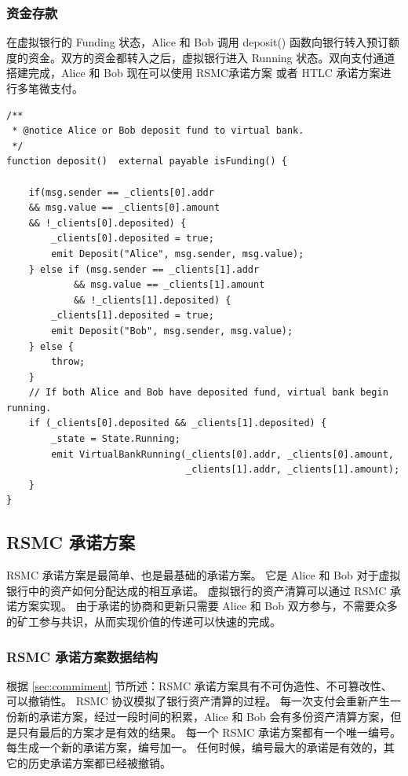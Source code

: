 \begin{appendices}
\subsubsection{资金存款}
在虚拟银行的 Funding 状态，Alice 和 Bob 调用 deposit() 函数向银行转入预订额度的资金。双方的资金都转入之后，虚拟银行进入 Running 状态。双向支付通道搭建完成，Alice 和 Bob 现在可以使用 RSMC承诺方案 或者 HTLC 承诺方案进行多笔微支付。

\begin{lstlisting}[caption={存款}, label={lst:deposit}]
/**
 * @notice Alice or Bob deposit fund to virtual bank.
 */
function deposit()  external payable isFunding() {

    if(msg.sender == _clients[0].addr 
    && msg.value == _clients[0].amount 
    && !_clients[0].deposited) {
        _clients[0].deposited = true;
        emit Deposit("Alice", msg.sender, msg.value);
    } else if (msg.sender == _clients[1].addr 
            && msg.value == _clients[1].amount 
            && !_clients[1].deposited) {
        _clients[1].deposited = true;
        emit Deposit("Bob", msg.sender, msg.value);
    } else {
        throw;
    }
    // If both Alice and Bob have deposited fund, virtual bank begin running.
    if (_clients[0].deposited && _clients[1].deposited) {
        _state = State.Running;
        emit VirtualBankRunning(_clients[0].addr, _clients[0].amount, 
                                _clients[1].addr, _clients[1].amount);
    }
}

\end{lstlisting}

\subsection{RSMC 承诺方案}

RSMC 承诺方案是最简单、也是最基础的承诺方案。
它是 Alice 和 Bob 对于虚拟银行中的资产如何分配达成的相互承诺。
虚拟银行的资产清算可以通过 RSMC 承诺方案实现。
由于承诺的协商和更新只需要 Alice 和 Bob 双方参与，不需要众多的矿工参与共识，从而实现价值的传递可以快速的完成。

\subsubsection{RSMC 承诺方案数据结构}
根据 \ref{sec:commiment} 节所述：RSMC 承诺方案具有不可伪造性、不可篡改性、可以撤销性。
RSMC 协议模拟了银行资产清算的过程。
每一次支付会重新产生一份新的承诺方案，经过一段时间的积累，Alice 和 Bob 会有多份资产清算方案，但是只有最后的方案才是有效的结果。
每一个 RSMC 承诺方案都有一个唯一编号。每生成一个新的承诺方案，编号加一。
任何时候，编号最大的承诺是有效的，其它的历史承诺方案都已经被撤销。


\end{appendices}
